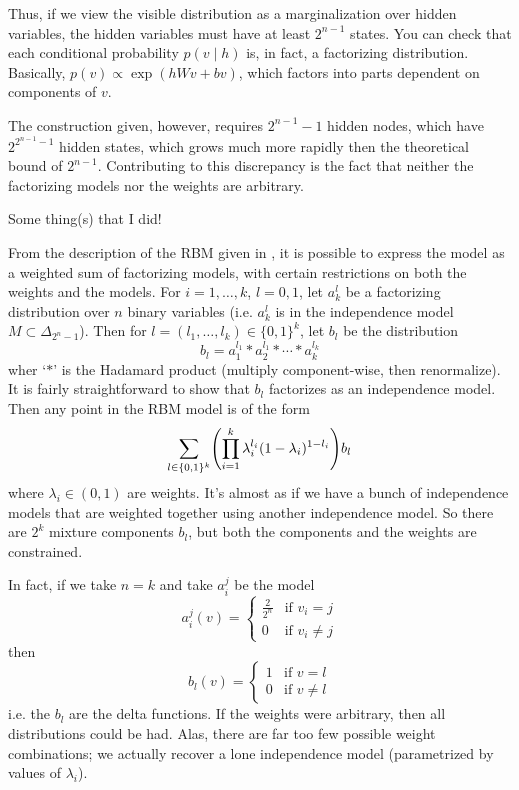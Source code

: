 \documentclass[11pt]{article}
\begin{document}
Thus, if we view the visible distribution as a marginalization over hidden
variables, the hidden variables must have at least $2^{n-1}$ states.  You can
check that each conditional probability $p(v \mid h)$ is, in fact, a factorizing
distribution.  Basically, $p(v) \propto \exp(hWv + bv)$, which factors into
parts dependent on components of $v$.

The construction given, however, requires $2^{n-1} - 1$ hidden nodes, which have
$2^{2^{n-1} - 1}$ hidden states, which grows much more rapidly then the
theoretical bound of $2^{n-1}$.  Contributing to this discrepancy is the fact
that neither the factorizing models nor the weights are arbitrary.

Some thing(s) that I did!

From the description of the RBM given in \cite{CMS09}, it is possible to express
the model as a weighted sum of factorizing models, with certain restrictions on
both the weights and the models.  For $i = 1, \ldots, k$, $l = 0,1$, let $a_k^l$
be a factorizing distribution over $n$ binary variables (i.e. $a_k^l$ is in the
independence model $M \subset \Delta_{2^n - 1}$).  Then for $l = (l_1, \ldots,
l_k) \in \{0,1\}^k$, let $b_l$ be the distribution
\[
    b_l = a_1^{l_1} * a_2^{l_1} * \cdots * a_k^{l_k}
\]
wher `$*$' is the Hadamard product (multiply component-wise, then renormalize).
It is fairly straightforward to show that $b_l$ factorizes as an independence
model.  Then any point in the RBM model is of the form
\[
    \sum_{l \in \{0,1\}^k} \pdil*{\prod_{i=1}^k \lambda_i^{l_i} (1 -
    \lambda_i)^{1 - l_i}} b_l
\]
where $\lambda_i \in (0,1)$ are weights.  It's almost as if we have a bunch of
independence models that are weighted together using another independence model.
So there are $2^k$ mixture components $b_l$, but both the components and the
weights are constrained.

In fact, if we take $n=k$ and take $a_i^j$ be the model
\[
    a_i^j(v) = \begin{cases}
        \frac{2}{2^n} & \text{if $v_i = j$}\\
        0 & \text{if $v_i \ne j$}
    \end{cases}
\]
then 
\[
    b_l(v) = \begin{cases}
        1 & \text{if $v = l$}\\
        0 & \text{if $v \ne l$}
    \end{cases}
\]
i.e. the $b_l$ are the delta functions.  If the weights were arbitrary, then all
distributions could be had.  Alas, there are far too few possible weight
combinations; we actually recover a lone independence model (parametrized by
values of $\lambda_i$).
\end{document}
